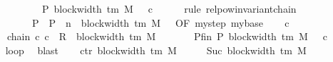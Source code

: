 \begin{isabellebody}
\ \ \ \ \ \ \ \ \ \ \ \ {\isasymand}\ {\isacharquery}{\kern0pt}P\ {\isacharparenleft}{\kern0pt}block{\isacharunderscore}{\kern0pt}width\ {\isacharparenleft}{\kern0pt}{\isasymGamma}{\isacharunderscore}{\kern0pt}tm\ M{\isacharparenright}{\kern0pt}\ {\isacharminus}{\kern0pt}\ {}{\isacharparenright}{\kern0pt}\ c{\isacharprime}{\kern0pt}{\isacharprime}{\kern0pt}{\isachardoublequoteclose}\isanewline
\ \ \ \ \isamarkupfalse%
\ {\isacharparenleft}{\kern0pt}rule\ relpow{\isacharunderscore}{\kern0pt}invariant{\isacharunderscore}{\kern0pt}chain\isanewline
\ \ \ \ \ \ \ \ \ \ {\isacharbrackleft}{\kern0pt}\ P\ {\isacharequal}{\kern0pt}\ {\isacharquery}{\kern0pt}P\ \ n\ {\isacharequal}{\kern0pt}\ {\isachardoublequoteopen}block{\isacharunderscore}{\kern0pt}width\ {\isacharparenleft}{\kern0pt}{\isasymGamma}{\isacharunderscore}{\kern0pt}tm\ M{\isacharparenright}{\kern0pt}\ {\isacharminus}{\kern0pt}\ {}{\isachardoublequoteclose}{\isacharcomma}{\kern0pt}\ OF\ mystep\ mybase{\isacharbrackright}{\kern0pt}{\isacharparenright}{\kern0pt}\isanewline
\ \ \isamarkupfalse%
\ c{\isacharprime}{\kern0pt}{\isacharprime}{\kern0pt}\ \isanewline
\ \ \ \ \ \ chain{\isacharcolon}{\kern0pt}\ {\isachardoublequoteopen}{\isacharparenleft}{\kern0pt}c{\isacharprime}{\kern0pt}{\isacharcomma}{\kern0pt}\ c{\isacharprime}{\kern0pt}{\isacharprime}{\kern0pt}{\isacharparenright}{\kern0pt}\ {\isasymin}\ R{\isacharprime}{\kern0pt}\ {\isacharcircum}{\kern0pt}{\isacharcircum}{\kern0pt}\ {\isacharparenleft}{\kern0pt}block{\isacharunderscore}{\kern0pt}width\ {\isacharparenleft}{\kern0pt}{\isasymGamma}{\isacharunderscore}{\kern0pt}tm\ M{\isacharparenright}{\kern0pt}\ {\isacharminus}{\kern0pt}\ {}{\isacharparenright}{\kern0pt}{\isachardoublequoteclose}\isanewline
\ \ \ \ \ Pfin{\isacharcolon}{\kern0pt}\ {\isachardoublequoteopen}{\isacharquery}{\kern0pt}P\ {\isacharparenleft}{\kern0pt}block{\isacharunderscore}{\kern0pt}width\ {\isacharparenleft}{\kern0pt}{\isasymGamma}{\isacharunderscore}{\kern0pt}tm\ M{\isacharparenright}{\kern0pt}\ {\isacharminus}{\kern0pt}\ {}{\isacharparenright}{\kern0pt}\ c{\isacharprime}{\kern0pt}{\isacharprime}{\kern0pt}{\isachardoublequoteclose}\isanewline
\ \ \ \ \isamarkupfalse%
\ loop\ \isamarkupfalse%
\ blast\isanewline
\ \ \isamarkupfalse%
\ ctr{\isacharcolon}{\kern0pt}\ {\isachardoublequoteopen}{\isacharparenleft}{\kern0pt}block{\isacharunderscore}{\kern0pt}width\ {\isacharparenleft}{\kern0pt}{\isasymGamma}{\isacharunderscore}{\kern0pt}tm\ M{\isacharparenright}{\kern0pt}\ {\isacharminus}{\kern0pt}\ {}{\isacharparenright}{\kern0pt}\ {\isacharplus}{\kern0pt}\ {}\ {\isacharequal}{\kern0pt}\ Suc\ {\isacharparenleft}{\kern0pt}block{\isacharunderscore}{\kern0pt}width\ {\isacharparenleft}{\kern0pt}{\isasymGamma}{\isacharunderscore}{\kern0pt}tm\ M{\isacharparenright}{\kern0pt}{\isacharparenright}{\kern0pt}{\isachardoublequoteclose}\isanewline

\end{isabellebody}
